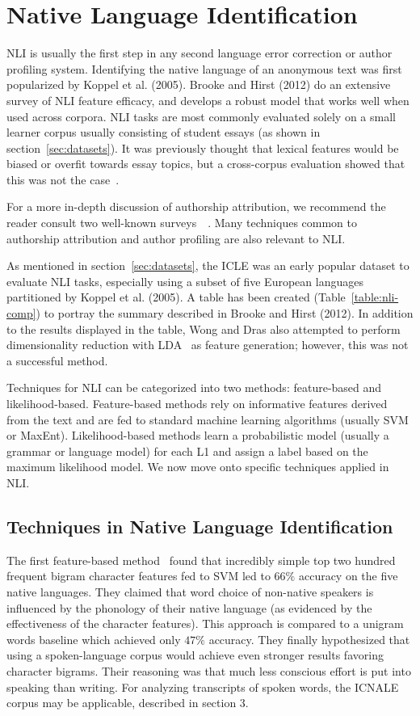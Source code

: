 \section{Native Language Identification}
\label{sec:nli}

NLI is usually the first step in any second language error correction or author
profiling system. Identifying the native language of an anonymous text was first
popularized by Koppel et al. (2005). Brooke and Hirst (2012) do an extensive
survey of NLI feature efficacy, and develops a robust model that works well when
used across corpora. NLI tasks are most commonly evaluated solely on a small
learner corpus usually consisting of student essays (as shown in
section~\ref{sec:datasets}). It was previously thought that lexical features
would be biased or overfit towards essay topics, but a cross-corpus evaluation
showed that this was not the case~\cite{2012-robust-nli}.

For a more in-depth discussion of authorship attribution, we recommend the
reader consult two well-known surveys~\cite{aa-survey}~\cite{koppel-survey}.
Many techniques common to authorship attribution and author profiling are also
relevant to NLI.

As mentioned in section~\ref{sec:datasets}, the ICLE was an early popular
dataset to evaluate NLI tasks, especially using a subset of five European
languages partitioned by Koppel et al. (2005). A table has been created
(Table~\ref{table:nli-comp}) to portray the summary described in Brooke and
Hirst (2012). In addition to the results displayed in the table, Wong and Dras
also attempted to perform dimensionality reduction with LDA~\cite{lda} as
feature generation; however, this was not a successful method.

Techniques for NLI can be categorized into two methods: feature-based and
likelihood-based. Feature-based methods rely on informative features derived
from the text and are fed to standard machine learning algorithms (usually SVM
or MaxEnt). Likelihood-based methods learn a probabilistic model (usually a
grammar or language model) for each L1 and assign a label based on the maximum
likelihood model. We now move onto specific techniques applied in NLI.

\subsection{Techniques in Native Language Identification}
\label{subsec:nli}

The first feature-based method~\cite{tsur} found that incredibly simple
top two hundred frequent bigram character features fed to SVM led to $66\%$
accuracy on the five native languages. They claimed that word choice of
non-native speakers is influenced by the phonology of their native language (as
evidenced by the effectiveness of the character features). This approach is
compared to a unigram words baseline which achieved only $47\%$ accuracy. They
finally hypothesized that using a spoken-language corpus would achieve even
stronger results favoring character bigrams. Their reasoning was that much less
conscious effort is put into speaking than writing. For analyzing transcripts of
spoken words, the ICNALE corpus may be applicable, described in section 3.

